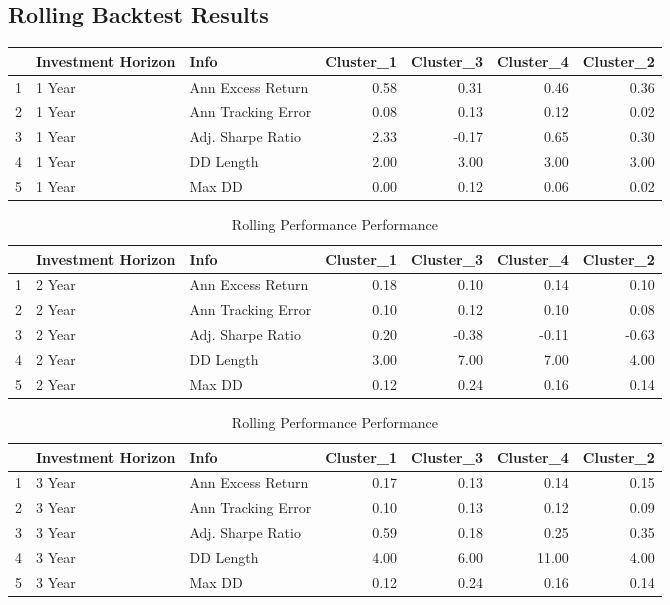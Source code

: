 \documentclass[11pt,preprint, authoryear]{elsarticle}
\let\origtable\table
\let\endorigtable\endtable
\renewenvironment{table}[1][2] {
    \expandafter\origtable\expandafter[H]
} {
    \endorigtable
}
\numberwithin{equation}{section}
\numberwithin{figure}{section}
\numberwithin{table}{section}
\begin{document}
\hypertarget{rolling-backtest-results}{%
\subsection{Rolling Backtest Results}\label{rolling-backtest-results}}

\begin{table}[H]
\centering
\caption{Rolling Performance Performance \label{tab6}} 
\begin{tabular}{rllrrrr}
  \hline
 & Investment Horizon & Info & Cluster\_1 & Cluster\_3 & Cluster\_4 & Cluster\_2 \\ 
  \hline
1 & 1 Year & Ann Excess Return & 0.58 & 0.31 & 0.46 & 0.36 \\ 
  2 & 1 Year & Ann Tracking Error & 0.08 & 0.13 & 0.12 & 0.02 \\ 
  3 & 1 Year & Adj. Sharpe Ratio & 2.33 & -0.17 & 0.65 & 0.30 \\ 
  4 & 1 Year & DD Length & 2.00 & 3.00 & 3.00 & 3.00 \\ 
  5 & 1 Year & Max DD & 0.00 & 0.12 & 0.06 & 0.02 \\ 
   \hline
\end{tabular}
\end{table}

\begin{longtable}{rllrrrr}
\caption{Rolling Performance Performance \label{tab7}} \\ 
  \hline
 & Investment Horizon & Info & Cluster\_1 & Cluster\_3 & Cluster\_4 & Cluster\_2 \\ 
  \hline
1 & 2 Year & Ann Excess Return & 0.18 & 0.10 & 0.14 & 0.10 \\ 
  2 & 2 Year & Ann Tracking Error & 0.10 & 0.12 & 0.10 & 0.08 \\ 
  3 & 2 Year & Adj. Sharpe Ratio & 0.20 & -0.38 & -0.11 & -0.63 \\ 
  4 & 2 Year & DD Length & 3.00 & 7.00 & 7.00 & 4.00 \\ 
  5 & 2 Year & Max DD & 0.12 & 0.24 & 0.16 & 0.14 \\ 
   \hline
\hline
\end{longtable}

\begin{longtable}{rllrrrr}
\caption{Rolling Performance Performance \label{tab8}} \\ 
  \hline
 & Investment Horizon & Info & Cluster\_1 & Cluster\_3 & Cluster\_4 & Cluster\_2 \\ 
  \hline
1 & 3 Year & Ann Excess Return & 0.17 & 0.13 & 0.14 & 0.15 \\ 
  2 & 3 Year & Ann Tracking Error & 0.10 & 0.13 & 0.12 & 0.09 \\ 
  3 & 3 Year & Adj. Sharpe Ratio & 0.59 & 0.18 & 0.25 & 0.35 \\ 
  4 & 3 Year & DD Length & 4.00 & 6.00 & 11.00 & 4.00 \\ 
  5 & 3 Year & Max DD & 0.12 & 0.24 & 0.16 & 0.14 \\ 
   \hline
\hline
\end{longtable}
\end{document}
